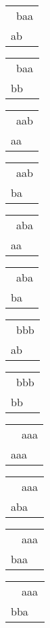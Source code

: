 \begin{tabular}{|l|} \hline
\ baa \\
ab\ \  \\
\hline
\end{tabular} 
\begin{tabular}{|l|} \hline
\ baa \\
bb\ \  \\
\hline
\end{tabular} 
\begin{tabular}{|l|} \hline
\ aab \\
aa\ \  \\
\hline
\end{tabular} 
\begin{tabular}{|l|} \hline
\ aab \\
ba\ \  \\
\hline
\end{tabular} 
\begin{tabular}{|l|} \hline
\ aba \\
aa\ \  \\
\hline
\end{tabular} 
\begin{tabular}{|l|} \hline
\ aba \\
ba\ \  \\
\hline
\end{tabular} 
\begin{tabular}{|l|} \hline
\ bbb \\
ab\ \  \\
\hline
\end{tabular} 
\begin{tabular}{|l|} \hline
\ bbb \\
bb\ \  \\
\hline
\end{tabular} 
\begin{tabular}{|l|} \hline
\ \ aaa \\
aaa\ \  \\
\hline
\end{tabular} 
\begin{tabular}{|l|} \hline
\ \ aaa \\
aba\ \  \\
\hline
\end{tabular} 
\begin{tabular}{|l|} \hline
\ \ aaa \\
baa\ \  \\
\hline
\end{tabular} 
\begin{tabular}{|l|} \hline
\ \ aaa \\
bba\ \  \\
\hline
\end{tabular} 
